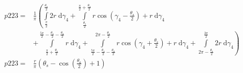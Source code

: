 \begin{align}
    p223 =&\frac{1}{\pi} \left(\int\limits_{\frac{\pi}{2}}^{\frac{\theta_{s}}{2}}2 r\;\mathrm{d}\gamma_{4}+\int\limits_{\frac{\theta_{s}}{2}}^{\frac{\pi}{2} + \frac{\theta_{s}}{2}}r \cos{\left (\gamma_{4} - \frac{\theta_{s}}{2} \right )} + r\;\mathrm{d}\gamma_{4}\right.\\
 &\left.+\int\limits_{\frac{\pi}{2} + \frac{\theta_{s}}{2}}^{\frac{5 \pi}{2} - \frac{\theta_{s}}{2} - \frac{\theta_{a}}{2}}r\;\mathrm{d}\gamma_{4}+\int\limits_{\frac{5 \pi}{2} - \frac{\theta_{s}}{2} - \frac{\theta_{a}}{2}}^{2 \pi - \frac{\theta_{s}}{2}}r \cos{\left (\gamma_{4} + \frac{\theta_{s}}{2} \right )} + r\;\mathrm{d}\gamma_{4}+\int\limits_{2 \pi - \frac{\theta_{s}}{2}}^{\frac{3 \pi}{2}}2 r\;\mathrm{d}\gamma_{4}\right)\\
    p223 =& \frac{r}{\pi} \left(\theta_{s} - \cos{\left (\frac{\theta_{a}}{2} \right )} + 1\right)
\end{align}